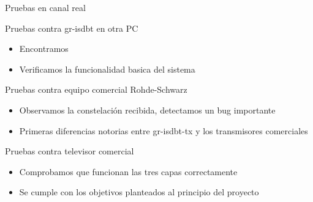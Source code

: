 \begin{frame}{Pruebas en canal real}
\begin{block}{Pruebas contra gr-isdbt en otra PC}
	\begin{itemize}
		\item { Encontramos  }
		\item { Verificamos la funcionalidad basica del sistema }
	\end{itemize}
\end{block}

\begin{block}{Pruebas contra equipo comercial Rohde-Schwarz}
	\begin{itemize}
		\item {	Observamos la constelación recibida, detectamos un bug importante }
		\item { Primeras diferencias notorias entre gr-isdbt-tx y los transmisores comerciales }
	\end{itemize}
\end{block}

\begin{block}{Pruebas contra televisor comercial}
	\begin{itemize}
		\item { Comprobamos que funcionan las tres capas correctamente  }
		\item { Se cumple con los objetivos planteados al principio del proyecto }
	\end{itemize}
\end{block}
\end{frame}